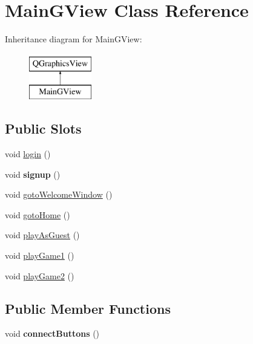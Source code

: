 \hypertarget{classMainGView}{\section{Main\-G\-View Class Reference}
\label{classMainGView}
}
Inheritance diagram for Main\-G\-View\-:\begin{figure}[H]
\begin{center}
\leavevmode
\includegraphics[height=2.000000cm]{classMainGView}
\end{center}
\end{figure}
\subsection*{Public Slots}
\begin{DoxyCompactItemize}
\item 
void \hyperlink{classMainGView_a0eee7c8673b0c9d6d8cda4a5fe1dbfd5}{login} ()
\item 
\hypertarget{classMainGView_a62f79a53d5eb0603cc9a8ad9a1980a02}{void {\bfseries signup} ()}\label{classMainGView_a62f79a53d5eb0603cc9a8ad9a1980a02}

\item 
void \hyperlink{classMainGView_aaa707c5179e3fffcf049b192a7c9cfe0}{goto\-Welcome\-Window} ()
\item 
void \hyperlink{classMainGView_a2fe8da24838ae723fbda4ccb87f5562b}{goto\-Home} ()
\item 
void \hyperlink{classMainGView_a9f97efb2efdebd3405395b954c46f582}{play\-As\-Guest} ()
\item 
void \hyperlink{classMainGView_a11c92e126dd71248eda32e221380f32f}{play\-Game1} ()
\item 
void \hyperlink{classMainGView_aa8828caf04f2a3e92b91e22292cb6a26}{play\-Game2} ()
\end{DoxyCompactItemize}
\subsection*{Public Member Functions}
\begin{DoxyCompactItemize}
\item 
\hypertarget{classMainGView_a8344d55c8979d4196e315f42b50ab50c}{void {\bfseries connect\-Buttons} ()}\label{classMainGView_a8344d55c8979d4196e315f42b50ab50c}

\end{DoxyCompactItemize}
